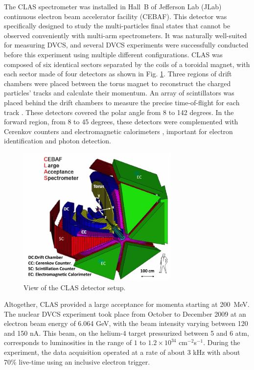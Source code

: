 \documentclass[aps,prc,preprint,superscriptaddress]{revtex4}
\begin{document}
The CLAS \cite{Mecking:2003zu} spectrometer was installed in Hall~B of Jefferson Lab (JLab) continuous electron beam 
accelerator facility (CEBAF). This detector was specifically designed to study the multi-particles 
final states that cannot be observed conveniently with multi-arm spectrometers. It was naturally 
well-suited for measuring DVCS, and several DVCS experiments were successfully conducted 
before this experiment using multiple different configurations. CLAS was composed of six identical 
sectors separated by the coils of a toroidal magnet, with each sector made of four detectors 
as shown in Fig. \ref{fig:CLAS}. Three regions of drift chambers \cite{Mestayer:2000we} 
were placed between the torus magnet to reconstruct the charged particles' tracks and 
calculate their momentum. An array of scintillators was placed behind the drift chambers to measure 
the precise time-of-flight for each track
\cite{Smith:1999ii}. These detectors covered the polar angle from 8 to 142 degrees. 
In the forward region, from 8 to 45 degrees, these detectors were complemented with 
Cerenkov counters \cite{Adams:2001kk} and electromagnetic calorimeters \cite{Amarian:2001zs},
important for electron identification and photon detection. 

\begin{figure}[tbp!]
\center
\includegraphics[width=8cm]{CLAS_geantview-PS.jpg}
	\caption{View of the CLAS detector setup.}
\label{fig:CLAS}
\end{figure}


Altogether, CLAS provided a large acceptance for momenta 
starting at 200~MeV. The nuclear DVCS experiment took place from October to December 2009
at an electron beam energy of 6.064 GeV, with the beam intensity varying
between 120 and 150 nA. This beam, on the helium-4 target pressurized between 5 and 6 atm,
corresponds to luminosities in the range of $1$ to $1.2 \times 10^{34}$ cm$^{-2}$s$^{-1}$.
During the experiment, the data acquisition operated at a rate of about 3 kHz with about 70\% live-time
using an inclusive electron trigger. 
\end{document}
